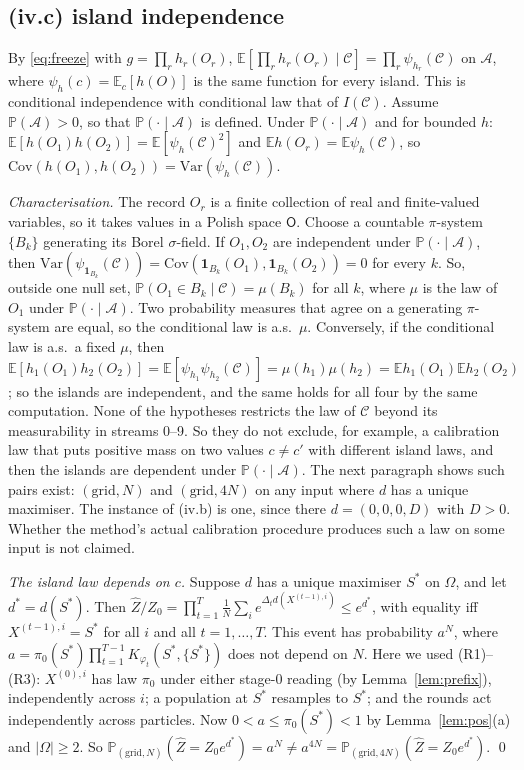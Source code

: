 \documentclass[11pt]{article}
\theoremstyle{remark}
\newcommand{\E}{\mathbb{E}}
\renewcommand{\P}{\mathbb{P}}
\newcommand{\cC}{\mathcal{C}}
\newcommand{\cA}{\mathcal{A}}
\newcommand{\Zh}{\widehat Z}
\newcommand{\ind}{\mathbf 1}
\newcommand{\Om}{\Omega}
\begin{document}
\subsection{(iv.c) island independence}
By \eqref{eq:freeze} with $g=\prod_rh_r(O_r)$, $\E[\prod_rh_r(O_r)\mid\cC]=\prod_r\psi_{h_r}(\cC)$ on $\cA$, where $\psi_h(c)=\E_c[h(O)]$ is the same function for every island. This is conditional independence with conditional law that of $I(\cC)$. Assume $\P(\cA)>0$, so that $\P(\cdot\mid\cA)$ is defined. Under $\P(\cdot\mid\cA)$ and for bounded $h$: $\E[h(O_1)h(O_2)]=\E[\psi_h(\cC)^2]$ and $\E h(O_r)=\E\psi_h(\cC)$, so $\mathrm{Cov}(h(O_1),h(O_2))=\mathrm{Var}(\psi_h(\cC))$.

\emph{Characterisation.} The record $O_r$ is a finite collection of real and finite-valued variables, so it takes values in a Polish space $\mathsf O$. Choose a countable $\pi$-system $\{B_k\}$ generating its Borel $\sigma$-field. If $O_1,O_2$ are independent under $\P(\cdot\mid\cA)$, then $\mathrm{Var}(\psi_{\ind_{B_k}}(\cC))=\mathrm{Cov}(\ind_{B_k}(O_1),\ind_{B_k}(O_2))=0$ for every $k$. So, outside one null set, $\P(O_1\in B_k\mid\cC)=\mu(B_k)$ for all $k$, where $\mu$ is the law of $O_1$ under $\P(\cdot\mid\cA)$. Two probability measures that agree on a generating $\pi$-system are equal, so the conditional law is a.s.\ $\mu$. Conversely, if the conditional law is a.s.\ a fixed $\mu$, then $\E[h_1(O_1)h_2(O_2)]=\E[\psi_{h_1}\psi_{h_2}(\cC)]=\mu(h_1)\mu(h_2)=\E h_1(O_1)\E h_2(O_2)$; so the islands are independent, and the same holds for all four by the same computation. None of the hypotheses restricts the law of $\cC$ beyond its measurability in streams 0--9. So they do not exclude, for example, a calibration law that puts positive mass on two values $c\ne c'$ with different island laws, and then the islands are dependent under $\P(\cdot\mid\cA)$. The next paragraph shows such pairs exist: $(\text{grid},N)$ and $(\text{grid},4N)$ on any input where $d$ has a unique maximiser. The instance of (iv.b) is one, since there $d=(0,0,0,D)$ with $D>0$. Whether the method's actual calibration procedure produces such a law on some input is not claimed.

\emph{The island law depends on $c$.} Suppose $d$ has a unique maximiser $S^*$ on $\Om$, and let $d^*=d(S^*)$. Then $\Zh/Z_0=\prod_{t=1}^T\frac1N\sum_ie^{\Delta_td(X^{(t-1),i})}\le e^{d^*}$, with equality iff $X^{(t-1),i}=S^*$ for all $i$ and all $t=1,\dots,T$. This event has probability $a^N$, where $a=\pi_0(S^*)\prod_{t=1}^{T-1}K_{\varphi_t}(S^*,\{S^*\})$ does not depend on $N$. Here we used (R1)--(R3): $X^{(0),i}$ has law $\pi_0$ under either stage-0 reading (by Lemma~\ref{lem:prefix}), independently across $i$; a population at $S^*$ resamples to $S^*$; and the rounds act independently across particles. Now $0<a\le\pi_0(S^*)<1$ by Lemma~\ref{lem:pos}(a) and $|\Om|\ge2$. So $\P_{(\text{grid},N)}(\Zh=Z_0e^{d^*})=a^N\ne a^{4N}=\P_{(\text{grid},4N)}(\Zh=Z_0e^{d^*})$. \qed
\end{document}
